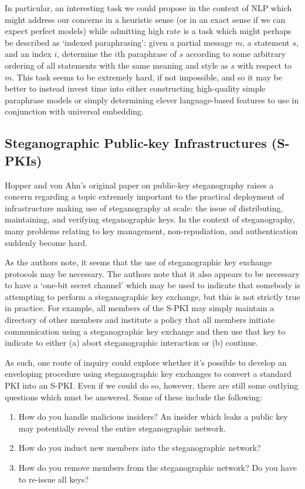\documentclass{article}
\begin{document}
In particular, an interesting task we could propose in the context of NLP which 
might address our concerns in a heuristic sense (or in an exact sense 
if we can expect perfect models) while admitting high rate is a task which 
might perhaps be described as `indexed paraphrasing': given a partial message $m$, a statement $s$, and 
an index $i$, determine the $i$th paraphrase of $s$ according to some arbitrary 
ordering of all statements with the same meaning and style as $s$ with respect to $m$.
This task seems to be extremely hard, if not impossible, and so it may be better to 
instead invest time into either constructing high-quality simple paraphrase models or 
simply determining clever language-based features to use in conjunction with 
universal embedding. 

\subsection{Steganographic Public-key Infrastructures (S-PKIs)}

Hopper and von Ahn's original paper on public-key steganography \cite{BiglouPubKey}
raises a concern regarding a topic extremely important to the practical deployment
of infrastructure making use of steganography at scale: the issue of distributing,
maintaining, and verifying steganographic keys.  In the context of steganography,
many problems relating to key management, non-repudiation, and authentication 
suddenly become hard.

As the authors note, it seems that the use of steganographic key exchange protocols 
may be necessary.  The authors note that it also appears to be necessary to 
have a `one-bit secret channel' which may be used to indicate that somebody is attempting to perform a steganographic key exchange, but this is not strictly 
true in practice.  For example, all members of the S-PKI may simply maintain 
a directory of other members and institute a policy that all members initiate 
communication using a steganographic key exchange and then use that key to indicate to either (a) abort steganographic interaction or (b) continue.

As such, one route of inquiry could explore whether it's possible to develop an enveloping procedure using steganographic key exchanges to convert a standard PKI 
into an S-PKI.  Even if we could do so, however, there are still some outlying 
questions which must be answered.  Some of these include the following:

\begin{enumerate}
\item{How do you handle malicious insiders?  An insider which leaks a public 
key may potentially reveal the entire steganographic network.}
\item{How do you induct new members into the steganographic network?}
\item{How do you remove members from the steganographic network?  Do you have to 
re-issue all keys?}
\end{enumerate}
\end{document}
